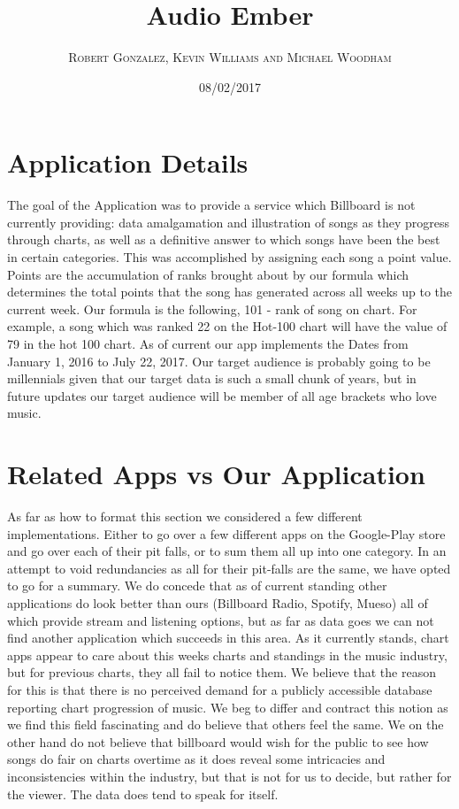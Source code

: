 \documentclass{article}
\begin{document}
\setlength\parindent{24pt}
\title{\textbf{Audio Ember}}
\author{\textsc{Robert Gonzalez, Kevin Williams and Michael Woodham}}
\date{08/02/2017}
\maketitle


\section*{Application Details}
The goal of the Application was to provide a service which Billboard is not currently providing:
data amalgamation and illustration of songs as they progress through charts, as well as a definitive answer to which songs have been the best in certain categories.
This was accomplished by assigning each song a point value.
Points are the accumulation of ranks brought about by our formula which determines the total points that the song has generated across all weeks up to the current week. 
Our formula is the following, 101 - rank of song on chart. 
For example, a song which was ranked 22 on the Hot-100 chart will have the value of 79 in the hot 100 chart.
As of current our app implements the Dates from January 1, 2016 to July 22, 2017.
Our target audience is probably going to be millennials given that our target data is such a small chunk of years, but in future updates our target audience will be member of all age brackets who love music.

\section*{Related Apps vs Our Application}
As far as how to format this section we considered a few different implementations.
Either to go over a few different apps on the Google-Play store and go over each of their pit falls, or to sum them all up into one category. 
In an attempt to void redundancies as all for their pit-falls are the same, we have opted to go for a summary. 
We do concede that as of current standing other applications do look better than ours (Billboard Radio, Spotify, Mueso) all of which provide stream and listening options,
but as far as data goes we can not find another application which succeeds in this area.
As it currently stands, chart apps appear to care about this weeks charts and standings in the music industry, but for previous charts, they all fail to notice them. 
We believe that the reason for this is that there is no perceived demand for a publicly accessible database reporting chart progression of music.
We beg to differ and contract this notion as we find this field fascinating and do believe that others feel the same.
We on the other hand do not believe that billboard would wish for the public to see how songs do fair on charts overtime as it does reveal some intricacies and inconsistencies within the industry,
but that is not for us to decide, but rather for the viewer. 
The data does tend to speak for itself.
\end{document}
